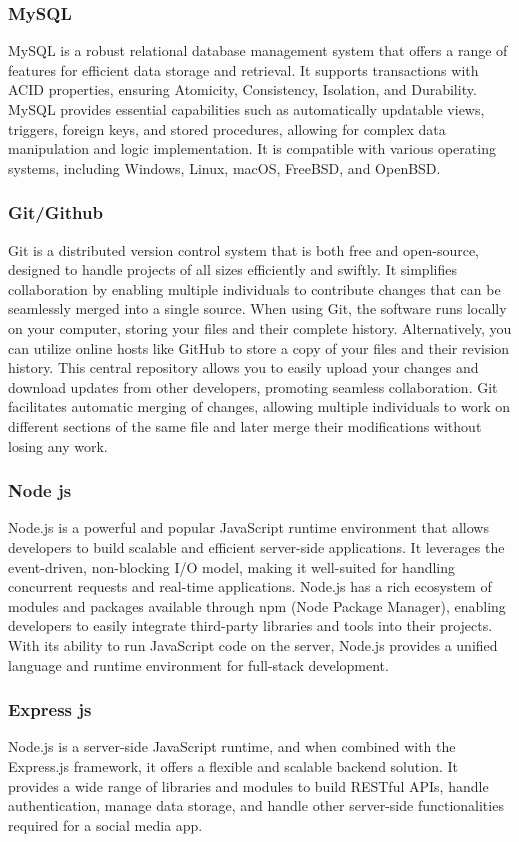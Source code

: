 \documentclass{article}
\begin{document}
\subsubsection{MySQL}
MySQL is a robust relational database management system that offers a range of features for efficient data storage and retrieval. It supports transactions with ACID properties, ensuring Atomicity, Consistency, Isolation, and Durability. MySQL provides essential capabilities such as automatically updatable views, triggers, foreign keys, and stored procedures, allowing for complex data manipulation and logic implementation. It is compatible with various operating systems, including Windows, Linux, macOS, FreeBSD, and OpenBSD. 
\subsubsection{Git/Github}
Git is a distributed version control system that is both free and open-source, designed to handle projects of all sizes efficiently and swiftly. It simplifies collaboration by enabling multiple individuals to contribute changes that can be seamlessly merged into a single source. When using Git, the software runs locally on your computer, storing your files and their complete history. Alternatively, you can utilize online hosts like GitHub to store a copy of your files and their revision history. This central repository allows you to easily upload your changes and download updates from other developers, promoting seamless collaboration. Git facilitates automatic merging of changes, allowing multiple individuals to work on different sections of the same file and later merge their modifications without losing any work.
\subsubsection{Node js}
Node.js is a powerful and popular JavaScript runtime environment that allows developers to build scalable and efficient server-side applications. It leverages the event-driven, non-blocking I/O model, making it well-suited for handling concurrent requests and real-time applications. Node.js has a rich ecosystem of modules and packages available through npm (Node Package Manager), enabling developers to easily integrate third-party libraries and tools into their projects. With its ability to run JavaScript code on the server, Node.js provides a unified language and runtime environment for full-stack development.
\subsubsection{Express js}
Node.js is a server-side JavaScript runtime, and when combined with the Express.js framework, it offers a flexible and scalable backend solution. It provides a wide range of libraries and modules to build RESTful APIs, handle authentication, manage data storage, and handle other server-side functionalities required for a social media app.
\end{document}
